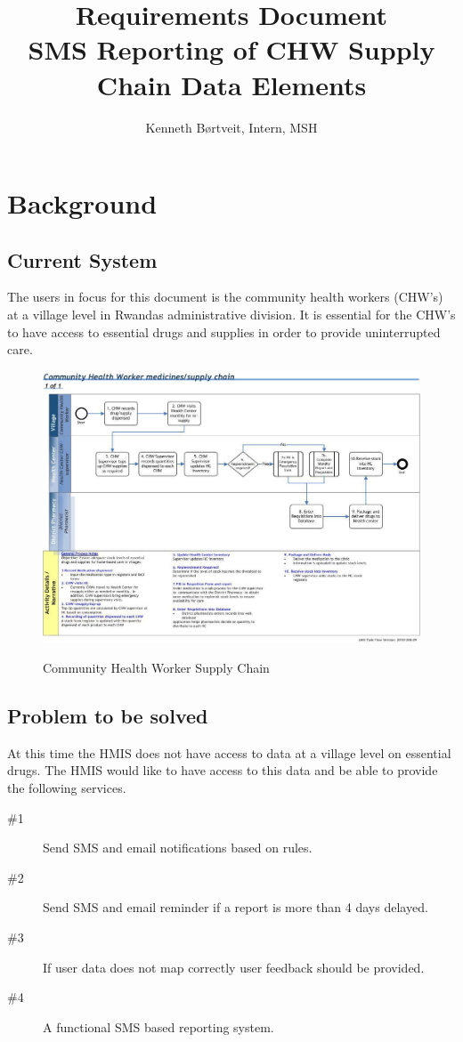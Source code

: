 \documentclass[a4paper, 11pt]{report}
\author{Kenneth Børtveit, Intern, MSH}
\title{{\Huge Requirements Document} \\ {\large SMS Reporting of CHW Supply Chain Data Elements}}
\begin{document}
\maketitle
\tableofcontents
\chapter{Background}

\section{Current System}
The users in focus for this document is the community health workers (CHW's) at a village level in Rwandas administrative division. It is essential for the CHW's to have access to essential drugs and supplies in order to provide uninterrupted care.

\begin{figure}
\includegraphics[width=\columnwidth]{sources/chwSupplyChain.jpg}
\label{fig:chwsc}
\caption{Community Health Worker Supply Chain}
\end{figure}

\section{Problem to be solved}
At this time the HMIS does not have access to data at a village level on essential drugs.
The HMIS would like to have access to this data and be able to provide the following services.

\begin{description}
\item[\#1] Send SMS and email notifications based on rules.
\item[\#2] Send SMS and email reminder if a report is more than 4 days delayed.
\item[\#3] If user data does not map correctly user feedback should be provided.
\item[\#4] A functional SMS based reporting system.
\end{description}
\end{document}
